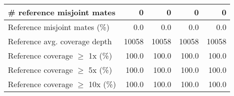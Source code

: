 \documentclass[12pt,a4paper]{article}
\begin{document}
\begin{table}[ht]
\begin{center}
\begin{tabular}{|l*{4}{|r}|}
\# reference misjoint mates & 0 & 0 & 0 & 0 \\ \hline
Reference misjoint mates (\%) & 0.0 & 0.0 & 0.0 & 0.0 \\ \hline
Reference avg. coverage depth & 10058 & 10058 & 10058 & 10058 \\ \hline
Reference coverage $\geq$ 1x (\%) & 100.0 & 100.0 & 100.0 & 100.0 \\ \hline
Reference coverage $\geq$ 5x (\%) & 100.0 & 100.0 & 100.0 & 100.0 \\ \hline
Reference coverage $\geq$ 10x (\%) & 100.0 & 100.0 & 100.0 & 100.0 \\ \hline
\end{tabular}
\end{center}
\end{table}
\end{document}
